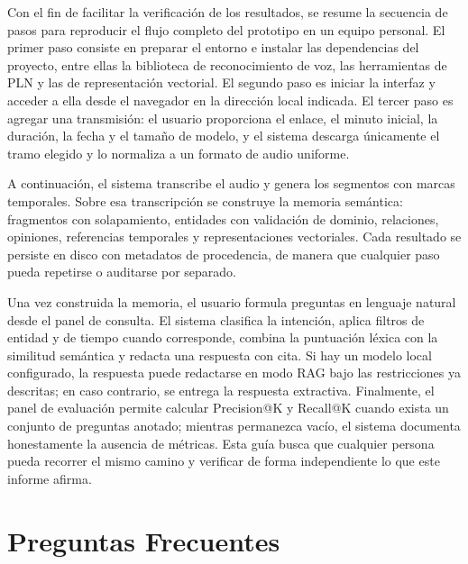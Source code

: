 \documentclass[12pt,a4paper]{article}
\begin{document}
Con el fin de facilitar la verificación de los resultados, se resume la secuencia de pasos para reproducir el flujo completo del prototipo en un equipo personal. El primer paso consiste en preparar el entorno e instalar las dependencias del proyecto, entre ellas la biblioteca de reconocimiento de voz, las herramientas de PLN y las de representación vectorial. El segundo paso es iniciar la interfaz y acceder a ella desde el navegador en la dirección local indicada. El tercer paso es agregar una transmisión: el usuario proporciona el enlace, el minuto inicial, la duración, la fecha y el tamaño de modelo, y el sistema descarga únicamente el tramo elegido y lo normaliza a un formato de audio uniforme.

A continuación, el sistema transcribe el audio y genera los segmentos con marcas temporales. Sobre esa transcripción se construye la memoria semántica: fragmentos con solapamiento, entidades con validación de dominio, relaciones, opiniones, referencias temporales y representaciones vectoriales. Cada resultado se persiste en disco con metadatos de procedencia, de manera que cualquier paso pueda repetirse o auditarse por separado.

Una vez construida la memoria, el usuario formula preguntas en lenguaje natural desde el panel de consulta. El sistema clasifica la intención, aplica filtros de entidad y de tiempo cuando corresponde, combina la puntuación léxica con la similitud semántica y redacta una respuesta con cita. Si hay un modelo local configurado, la respuesta puede redactarse en modo RAG bajo las restricciones ya descritas; en caso contrario, se entrega la respuesta extractiva. Finalmente, el panel de evaluación permite calcular Precision@K y Recall@K cuando exista un conjunto de preguntas anotado; mientras permanezca vacío, el sistema documenta honestamente la ausencia de métricas. Esta guía busca que cualquier persona pueda recorrer el mismo camino y verificar de forma independiente lo que este informe afirma.



\section{Preguntas Frecuentes}
\label{anexo:faq}
\end{document}
